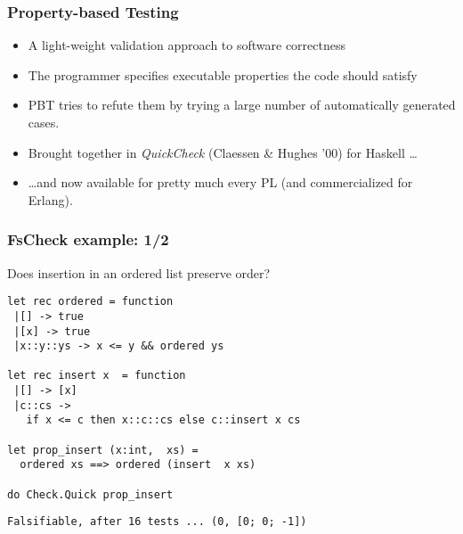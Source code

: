 \documentclass{beamer}
\begin{document}
\begin{frame}[fragile]\frametitle{Property-based Testing}
  \begin{itemize}
  \item A light-weight validation approach to software correctness
  \item The programmer specifies executable properties  the code should satisfy
  \item PBT tries to refute them  by trying a  large number of
    automatically generated cases.
     \item Brought together in \emph{QuickCheck} (Claessen \& Hughes '00) for Haskell \dots
       
     \item \dots and now available for pretty much every PL (and
       commercialized for Erlang).
  \end{itemize}


\end{frame}

\begin{frame}[fragile]
  \frametitle{FsCheck example: 1/2}
  Does insertion in an ordered list preserve order?
  \begin{small}
    \begin{lstlisting}
let rec ordered = function                      
 |[] -> true
 |[x] -> true
 |x::y::ys -> x <= y && ordered ys  

let rec insert x  = function 
 |[] -> [x]
 |c::cs -> 
   if x <= c then x::c::cs else c::insert x cs
 
let prop_insert (x:int,  xs) =  
  ordered xs ==> ordered (insert  x xs)

do Check.Quick prop_insert
    \end{lstlisting}
  \end{small}

  \begin{small}
    \begin{lstlisting}
Falsifiable, after 16 tests ... (0, [0; 0; -1])
    \end{lstlisting}
  \end{small}
\end{frame}
\end{document}
